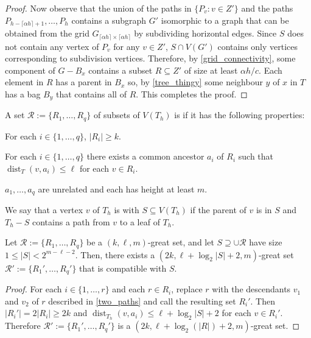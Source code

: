 \documentclass{patmorin}
\DeclareMathOperator{\dist}{dist}
\renewcommand{\le}{\leqslant}
\renewcommand{\ge}{\geqslant}
\begin{document}
\begin{proof}
  Now observe that the union of the paths in  $\{P_{v}:v\in Z'\}$ and the paths $P_{h-\lceil\alpha h\rceil+1},\ldots,P_{h}$ contains a subgraph $G'$ isomorphic to a graph that can be obtained from the grid $G_{\lceil \alpha h\rceil\times\lceil \alpha h\rceil}$ by subdividing horizontal edges.  Since $S$ does not contain any vertex of $P_{v}$ for any $v\in Z'$,  $S\cap V(G')$ contains only vertices corresponding to subdivision vertices.  Therefore, by \cref{grid_connectivity}, some component of $G-B_x$ contains a subset $R\subseteq Z'$ of size at least $\alpha h/c$.  Each element in $R$ has a parent in $B_x$ so, by \cref{tree_thingy} some neighbour $y$ of $x$ in $T$ has a bag $B_y$ that contains all of $R$.  This completes the proof.
\end{proof}


A set $\mathcal{R}:=\{R_1,\ldots,R_q\}$ of subsets of $V(T_h)$ is  if it has the following properties:

\begin{compactenum}
  \item For each $i\in\{1,\ldots,q\}$, $|R_i|\ge k$.
  \item For each $i\in\{1,\ldots,q\}$ there exists a common ancestor $a_i$ of $R_i$ such that $\dist_T(v,a_i)\le\ell$ for each $v\in R_i$.
  \item $a_1,\ldots,a_q$ are unrelated and each has height at least $m$.
\end{compactenum}

We say that a vertex $v$ of $T_h$ is  with $S\subseteq V(T_h)$ if the parent of $v$ is in $S$ and $T_h-S$ contains a path from $v$ to a leaf of $T_h$.


\begin{lem}\label{compatible_set}
  Let $\mathcal{R}:=\{R_1,\ldots,R_q\}$ be a $(k,\ell,m)$-great set,  and let $S\supseteq \cup\mathcal{R}$ have size $1\le |S|< 2^{m-\ell-2}$.  Then, there exists a $(2k,\ell + \log_2|S|+2,m)$-great set $\mathcal{R}':=\{R_1',\ldots,R_q'\}$ that is compatible with $S$.
\end{lem}

\begin{proof}
  For each $i\in\{1,\ldots,r\}$ and each $r\in R_i$, replace $r$ with the descendants $v_1$ and $v_2$ of $r$ described in \cref{two_paths} and call the resulting set $R_i'$.   Then $|R_i'|=2|R_i|\ge 2k$ and $\dist_{T_h}(v,a_i)\le \ell+\log_2|S|+2$ for each $v\in R_i'$.  Therefore $\mathcal{R}':=\{R_1',\ldots,R_q'\}$ is a $(2k,\ell + \log_2(|R|)+2,m)$-great set.
\end{proof}
\end{document}
